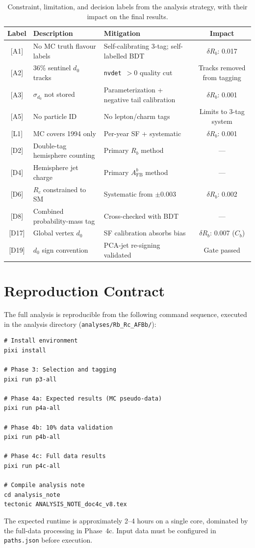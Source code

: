 \documentclass[11pt,a4paper]{article}
\begin{document}
\begin{table}[htbp]
\centering
\caption{Constraint, limitation, and decision labels from the analysis
  strategy, with their impact on the final results.}
\label{tbl:limitation-index}
\begin{tabular}{cp{5cm}p{5cm}c}
\toprule
Label & Description & Mitigation & Impact \\
\midrule
{[A1]} & No MC truth flavour labels & Self-calibrating 3-tag; self-labelled BDT & $\delta R_b$: 0.017 \\
{[A2]} & 36\% sentinel $d_0$ tracks & \texttt{nvdet}~$>0$ quality cut & Tracks removed from tagging \\
{[A3]} & $\sigma_{d_0}$ not stored & Parameterization + negative tail calibration & $\delta R_b$: 0.001 \\
{[A5]} & No particle ID & No lepton/charm tags & Limits to 3-tag system \\
{[L1]} & MC covers 1994 only & Per-year SF + systematic & $\delta R_b$: 0.001 \\
{[D2]} & Double-tag hemisphere counting & Primary $R_b$ method & --- \\
{[D4]} & Hemisphere jet charge & Primary $A_\mathrm{FB}^b$ method & --- \\
{[D6]} & $R_c$ constrained to SM & Systematic from $\pm$0.003 & $\delta R_b$: 0.002 \\
{[D8]} & Combined probability-mass tag & Cross-checked with BDT & --- \\
{[D17]} & Global vertex $d_0$ & SF calibration absorbs bias & $\delta R_b$: 0.007 ($C_b$) \\
{[D19]} & $d_0$ sign convention & PCA-jet re-signing validated & Gate passed \\
\bottomrule
\end{tabular}
\end{table}

\section{Reproduction Contract}
\label{app:reproduction}

The full analysis is reproducible from the following command sequence,
executed in the analysis directory
(\texttt{analyses/Rb\_Rc\_AFBb/}):

\begin{verbatim}
# Install environment
pixi install

# Phase 3: Selection and tagging
pixi run p3-all

# Phase 4a: Expected results (MC pseudo-data)
pixi run p4a-all

# Phase 4b: 10% data validation
pixi run p4b-all

# Phase 4c: Full data results
pixi run p4c-all

# Compile analysis note
cd analysis_note
tectonic ANALYSIS_NOTE_doc4c_v8.tex
\end{verbatim}

The expected runtime is approximately 2--4 hours on a single core,
dominated by the full-data processing in Phase~4c.  Input data must be
configured in \texttt{paths.json} before execution.
\end{document}
